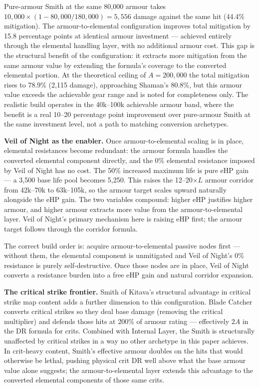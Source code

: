 \documentclass[12pt, letterpaper]{article}
\begin{document}
Pure-armour Smith at the same 80{,}000 armour takes $10{,}000 \times (1 - 80{,}000 / 180{,}000) = 5{,}556$ damage against the same hit (44.4\% mitigation). The armour-to-elemental configuration improves total mitigation by 15.8 percentage points at identical armour investment --- achieved entirely through the elemental handling layer, with no additional armour cost. This gap is the structural benefit of the configuration: it extracts more mitigation from the same armour value by extending the formula's coverage to the converted elemental portion. At the theoretical ceiling of $A = 200{,}000$ the total mitigation rises to 78.9\% (2{,}115 damage), approaching Shaman's 80.8\%, but this armour value exceeds the achievable gear range and is noted for completeness only. The realistic build operates in the 40k--100k achievable armour band, where the benefit is a real 10--20 percentage point improvement over pure-armour Smith at the same investment level, not a path to matching conversion archetypes.

\textbf{Veil of Night as the enabler.} Once armour-to-elemental scaling is in place, elemental resistances become redundant: the armour formula handles the converted elemental component directly, and the 0\% elemental resistance imposed by Veil of Night has no cost. The 50\% increased maximum life is pure eHP gain --- a 3{,}500 base life pool becomes 5{,}250. This raises the 12--20$\times L$ armour corridor from 42k--70k to 63k--105k, so the armour target scales upward naturally alongside the eHP gain. The two variables compound: higher eHP justifies higher armour, and higher armour extracts more value from the armour-to-elemental layer. Veil of Night's primary mechanism here is raising eHP first; the armour target follows through the corridor formula.

The correct build order is: acquire armour-to-elemental passive nodes first --- without them, the elemental component is unmitigated and Veil of Night's 0\% resistance is purely self-destructive. Once those nodes are in place, Veil of Night converts a resistance burden into a free eHP gain and natural corridor expansion.

\textbf{The critical strike frontier.} Smith of Kitava's structural advantage in critical strike map content adds a further dimension to this configuration. Blade Catcher converts critical strikes so they deal base damage (removing the critical multiplier) and defends those hits at 200\% of armour rating --- effectively $2A$ in the DR formula for crits. Combined with Internal Layer, the Smith is structurally unaffected by critical strikes in a way no other archetype in this paper achieves. In crit-heavy content, Smith's effective armour doubles on the hits that would otherwise be lethal, pushing physical crit DR well above what the base armour value alone suggests; the armour-to-elemental layer extends this advantage to the converted elemental components of those same crits.
\end{document}
